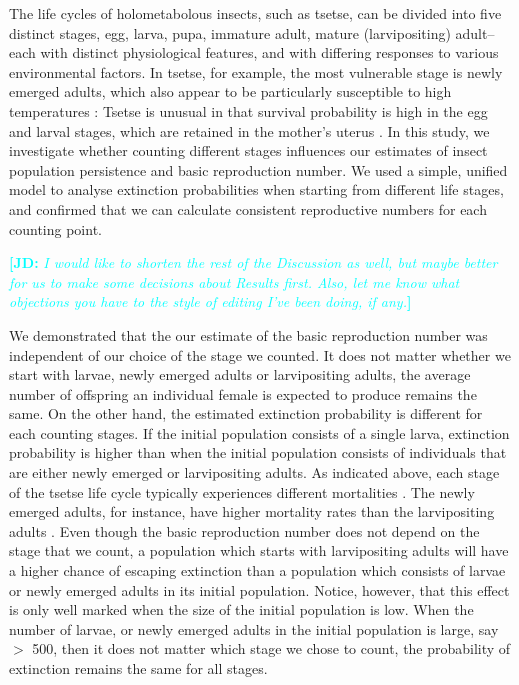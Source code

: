 \documentclass[smallextended]{svjour3}
\newcommand{\comment}[3]{\textcolor{#1}{\textbf{[#2: }\textit{#3}\textbf{]}}}
\newcommand{\jd}[1]{\comment{cyan}{JD}{#1}}
\begin{document}
The life cycles of holometabolous insects, such as tsetse, can be divided into five distinct stages, egg, larva, pupa, immature adult, mature (larvipositing) adult– each with distinct physiological features, and with differing responses to various environmental factors. In tsetse, for example, the most vulnerable stage is newly emerged adults, which also appear to be particularly susceptible to high temperatures \cite{Ackley2017a}: Tsetse is unusual in that survival probability is high in the egg and larval stages, which are retained in the mother’s uterus \cite{Hargrove1999a}. In this study, we investigate whether counting different stages influences our estimates of insect population persistence and basic reproduction number. We used  a simple, unified model to analyse extinction probabilities when starting from different life stages, and confirmed that we can calculate consistent reproductive numbers for each counting point. 

\jd{I would like to shorten the rest of the Discussion as well, but maybe better for us to make some decisions about Results first. Also, let me know what objections you have to the style of editing I've been doing, if any.}

We demonstrated that the our estimate of the basic reproduction number was independent of our choice of the stage we counted. It does not matter whether we start with larvae, newly emerged adults or larvipositing adults, the average number of offspring an individual female is expected to produce remains the same. On the other hand, the estimated extinction probability is different for each counting stages. If the initial population consists of a single larva, extinction probability is higher than when the initial population consists of individuals that are either newly emerged or larvipositing adults. As indicated above, each stage of the tsetse life cycle typically experiences different mortalities \cite{Hargrove2005a}. The newly emerged adults, for instance, have higher mortality rates than the larvipositing adults  \cite{Hargrove2019a}. Even though the basic reproduction number does not depend on the stage that we count, a population which starts with larvipositing adults will have a higher chance of escaping extinction than a population which consists of larvae or newly emerged adults in its initial population. Notice, however, that this effect is only well marked when the size of the initial population is low. When the number of larvae, or newly emerged adults in the initial population is large, say $>$ 500, then it does not matter which stage we chose to count, the probability of extinction remains the same for all stages.
\end{document}
